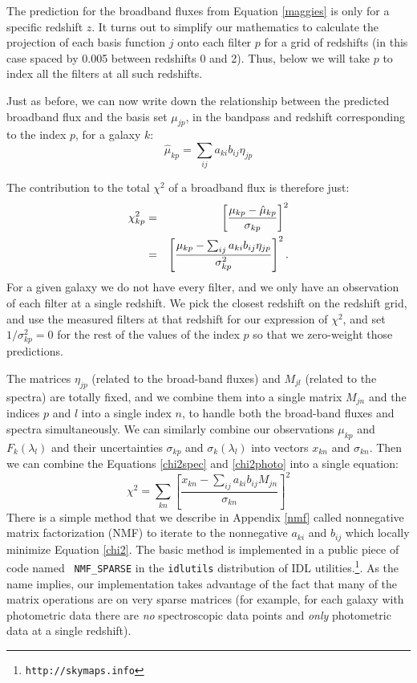 \documentclass[10pt,preprint]{aastex}
\begin{document}
The prediction for the broadband fluxes from Equation
\ref{maggies} is only for a specific redshift $z$. It turns out to
simplify our mathematics to calculate the projection of each basis
function $j$ onto each filter $p$ for a grid of redshifts (in this
case spaced by 0.005 between redshifts 0 and 2). Thus, below we will
take $p$ to index all the filters at all such redshifts.

Just as before, we can now write down the relationship between the
predicted broadband flux and the basis set $\mu_{jp}$, in the bandpass
and redshift corresponding to the index $p$, for a galaxy $k$:
\begin{equation}
\hat{\mu}_{kp} = \sum_{ij} a_{ki} b_{ij} \eta_{jp}
\end{equation}

The contribution to the total $\chi^2$ of a broadband flux is
therefore just:
\begin{eqnarray}
\label{chi2photo}
\chi^2_{kp} &=& \left[\frac{\mu_{kp} - \hat\mu_{kp}}
{\sigma_{kp}}\right]^2 \cr
&=&
\left[\frac{\mu_{kp} -
\sum_{ij} a_{ki} b_{ij} \eta_{jp}
}{\sigma^2_{kp}}\right]^2. 
\end{eqnarray}
For a given galaxy we do not have every filter, and we only have an
observation of each filter at a single redshift. We pick the closest
redshift on the redshift grid, and use the measured filters at that
redshift for our expression of $\chi^2$, and set $1/\sigma_{kp}^2 = 0$
for the rest of the values of the index $p$ so that we zero-weight
those predictions.

The matrices $\eta_{jp}$ (related to the broad-band fluxes) and
$M_{jl}$ (related to the spectra) are totally fixed, and we combine
them into a single matrix $M_{jn}$ and the indices $p$ and $l$ into a
single index $n$, to handle both the broad-band fluxes and spectra
simultaneously. We can similarly combine our observations $\mu_{kp}$
and $F_{k}(\lambda_l)$ and their uncertainties $\sigma_{kp}$
and $\sigma_{k}(\lambda_l)$ into vectors $x_{kn}$ and $\sigma_{kn}$.
Then we can combine the Equations \ref{chi2spec} and
\ref{chi2photo} into a single equation:
\begin{equation}
\label{chi2}
\chi^2 = \sum_{kn} \left[ 
\frac{x_{kn} - \sum_{ij} a_{ki} b_{ij} M_{jn}}
{\sigma_{kn}} \right]^2
\end{equation}
There is a simple method that we describe in Appendix \ref{nmf} called
nonnegative matrix factorization (NMF) to iterate to the nonnegative
$a_{ki}$ and $b_{ij}$ which locally minimize Equation \ref{chi2}. The
basic method is implemented in a public piece of code named {\tt
NMF\_SPARSE} in the {\tt idlutils} distribution of IDL
utilities.\footnote{\tt http://skymaps.info}. As the name implies, our
implementation takes advantage of the fact that many of the matrix
operations are on very sparse matrices (for example, for each galaxy
with photometric data there are {\it no} spectroscopic data points and
{\it only} photometric data at a single redshift).
\end{document}
